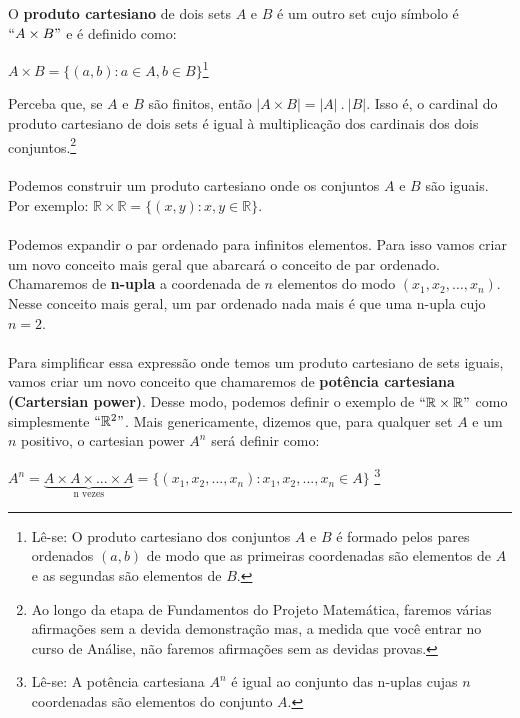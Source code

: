 \documentclass[main.tex]{subfiles}
\begin{document}
\begin{definition}
O \textbf{produto cartesiano} de dois sets $A$ e $B$ é um outro set cujo símbolo é $``A \times B"$ e é definido como:
\begin{center}
$A \times B = \{ (a,b) : a \in A, b \in B \}$\footnote{Lê-se: O produto cartesiano dos conjuntos $A$ e $B$ é formado pelos pares ordenados $(a,b)$ de modo que as primeiras coordenadas são elementos de $A$ e as segundas são elementos de $B$.}
\end{center}
\end{definition}

Perceba que, se $A$ e $B$ são finitos, então $| A \times B | = |A| \ . \ |B|$. Isso é, o cardinal do produto cartesiano de dois sets é igual à multiplicação dos cardinais dos dois conjuntos.\footnote{Ao longo da etapa de Fundamentos do Projeto Matemática, faremos várias afirmações sem a devida demonstração mas, a medida que você entrar no curso de Análise, não faremos afirmações sem as devidas provas.}
\\~\\
Podemos construir um produto cartesiano onde os conjuntos $A$ e $B$ são iguais. Por exemplo: $\mathbb{R} \times \mathbb{R} = \{ (x,y) : x,y \in \mathbb{R} \}$.
\\~\\
Podemos expandir o par ordenado para infinitos elementos. Para isso vamos criar um novo conceito mais geral que abarcará o conceito de par ordenado. Chamaremos de \textbf{n-upla} a coordenada de $n$ elementos do modo $(x_1, x_2, \dots, x_n)$. Nesse conceito mais geral, um par ordenado nada mais é que uma n-upla cujo $n = 2$.
\\~\\
Para simplificar essa expressão onde temos um produto cartesiano de sets iguais, vamos criar um novo conceito que chamaremos de \textbf{potência cartesiana (Cartersian power)}. Desse modo, podemos definir o exemplo de $``\mathbb{R} \times \mathbb{R}"$ como simplesmente $``\mathbb{R}^2"$. Mais genericamente, dizemos que, para qualquer set $A$ e um $n$ positivo, o cartesian power $A^n$ será definir como:

\begin{center}
	$ A^n = \underbrace{A \times A \times ... \times A}_\text{n \ vezes} = \{ (x_1,x_2, ... , x_n) : x_1,x_2, ... , x_n \in A \} $ \footnote{Lê-se: A potência cartesiana $A^n$ é igual ao conjunto das n-uplas cujas $n$ coordenadas são elementos do conjunto $A$.}
\end{center}
\end{document}
